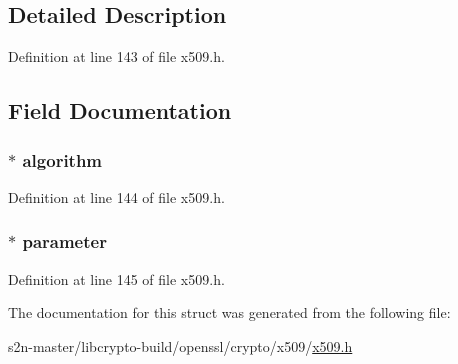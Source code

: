 \subsection{Detailed Description}


Definition at line 143 of file x509.\+h.



\subsection{Field Documentation}
\subsubsection[{\texorpdfstring{algorithm}{algorithm}}]{ $\ast$ algorithm}\hypertarget{struct_x509__algor__st_a89501315d92635d17b25568e50adf73a}{}\label{struct_x509__algor__st_a89501315d92635d17b25568e50adf73a}


Definition at line 144 of file x509.\+h.

\subsubsection[{\texorpdfstring{parameter}{parameter}}]{ $\ast$ parameter}\hypertarget{struct_x509__algor__st_a52a7043c44f1dc2b6b7acac1f6bd29f5}{}\label{struct_x509__algor__st_a52a7043c44f1dc2b6b7acac1f6bd29f5}


Definition at line 145 of file x509.\+h.



The documentation for this struct was generated from the following file\+:\begin{DoxyCompactItemize}
\item 
s2n-\/master/libcrypto-\/build/openssl/crypto/x509/\hyperlink{crypto_2x509_2x509_8h}{x509.\+h}\end{DoxyCompactItemize}
